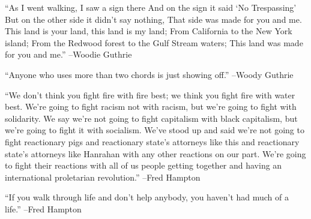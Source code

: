 \documentclass{article}%
\begin{document}
\linebreak%
\vspace{1mm}%
\begin{minipage}{\textwidth}%
\flushleft%
“As I went walking, I saw a sign there And on the sign it said ‘No Trespassing’ But on the other side it didn't say nothing, That side was made for you and me. This land is your land, this land is my land; From California to the New York island; From the Redwood forest to the Gulf Stream waters; This land was made for you and me.”%
\linebreak%
\vspace{1mm}%
–Woodie Guthrie%
\linebreak%
\vspace{1mm}%
\end{minipage}%
\linebreak%
\vspace{1mm}%
\begin{minipage}{\textwidth}%
\flushleft%
“Anyone who uses more than two chords is just showing off.”%
\linebreak%
\vspace{1mm}%
–Woody Guthrie%
\linebreak%
\vspace{1mm}%
\end{minipage}%
\linebreak%
\vspace{1mm}%
\begin{minipage}{\textwidth}%
\flushleft%
“We don't think you fight fire with fire best; we think you fight fire with water best. We're going to fight racism not with racism, but we're going to fight with solidarity. We say we're not going to fight capitalism with black capitalism, but we're going to fight it with socialism. We've stood up and said we're not going to fight reactionary pigs and reactionary state's attorneys like this and reactionary state's attorneys like Hanrahan with any other reactions on our part. We're going to fight their reactions with all of us people getting together and having an international proletarian revolution.”%
\linebreak%
\vspace{1mm}%
–Fred Hampton%
\linebreak%
\vspace{1mm}%
\end{minipage}%
\linebreak%
\vspace{1mm}%
\begin{minipage}{\textwidth}%
\flushleft%
“If you walk through life and don't help anybody, you haven't had much of a life.”%
\linebreak%
\vspace{1mm}%
–Fred Hampton%
\linebreak%
\vspace{1mm}%
\end{minipage}%
\end{document}
